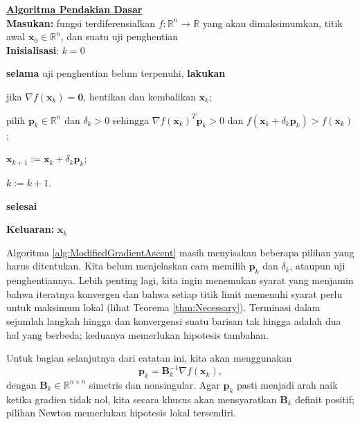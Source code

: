 \begin{cgalgorithm}
\caption{Algoritma Pendakian Dasar}
\label{alg:ModifiedGradientAscent}
\begin{minipage}[t]{\textwidth-1em}
\underline{\textbf{Algoritma Pendakian Dasar}}\\
\textbf{Masukan:} fungsi terdiferensialkan $f:\mathbb{R}^n \rightarrow \mathbb{R}$ yang akan dimaksimumkan, titik awal $\mathbf{x}_0 \in \mathbb{R}^n$, dan suatu uji penghentian\\
\textbf{Inisialisasi}: $k = 0$
\begin{enumerate*}
\item \textbf{selama} uji penghentian belum terpenuhi, \textbf{lakukan}
\item \hspace*{2em} jika $\nabla f(\mathbf{x}_k)=\mathbf{0}$, hentikan dan kembalikan $\mathbf{x}_k$;
\item \hspace*{2em} pilih $\mathbf{p}_k \in \mathbb{R}^{n}$ dan $\delta_k > 0$ sehingga $\nabla f(\mathbf{x}_k)^T\mathbf{p}_k > 0$ dan $f(\mathbf{x}_k+\delta_k\mathbf{p}_k)>f(\mathbf{x}_k)$;
\item \hspace*{2em} $\mathbf{x}_{k+1} := \mathbf{x}_k + \delta_k\mathbf{p}_k$;
\item \hspace*{2em} $k := k+1$.
\item \textbf{selesai}
\end{enumerate*}
\textbf{Keluaran:} $\mathbf{x}_{k}$
\end{minipage}
\end{cgalgorithm}

\begin{remark} Algoritma \ref{alg:ModifiedGradientAscent} masih menyisakan beberapa pilihan yang harus ditentukan. Kita belum menjelaskan cara memilih $\mathbf{p}_k$ dan $\delta_k$, ataupun uji penghentiannya. Lebih penting lagi, kita ingin menemukan syarat yang menjamin bahwa iteratnya konvergen dan bahwa setiap titik limit memenuhi syarat perlu untuk maksimum lokal (lihat Teorema \ref{thm:Necessary}). Terminasi dalam sejumlah langkah hingga dan konvergensi suatu barisan tak hingga adalah dua hal yang berbeda; keduanya memerlukan hipotesis tambahan.
\end{remark}

\begin{remark} Untuk bagian selanjutnya dari catatan ini, kita akan menggunakan
\begin{displaymath}
\mathbf{p}_k = \mathbf{B}_k^{-1} \nabla f(\mathbf{x}_k),
\end{displaymath}
dengan $\mathbf{B}_k \in \mathbb{R}^{n \times n}$ simetris dan nonsingular. Agar $\mathbf{p}_k$ pasti menjadi arah naik ketika gradien tidak nol, kita secara khusus akan mensyaratkan $\mathbf{B}_k$ definit positif; pilihan Newton memerlukan hipotesis lokal tersendiri.
\end{remark}

